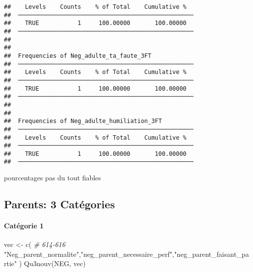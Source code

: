\documentclass[
]{article}
\newenvironment{Shaded}{\begin{snugshade}}{\end{snugshade}}
\newcommand{\CommentTok}[1]{\textcolor[rgb]{0.56,0.35,0.01}{\textit{#1}}}
\newcommand{\FunctionTok}[1]{\textcolor[rgb]{0.00,0.00,0.00}{#1}}
\newcommand{\NormalTok}[1]{#1}
\newcommand{\OtherTok}[1]{\textcolor[rgb]{0.56,0.35,0.01}{#1}}
\newcommand{\StringTok}[1]{\textcolor[rgb]{0.31,0.60,0.02}{#1}}
\begin{document}
\begin{verbatim}
##    Levels    Counts    % of Total    Cumulative %   
##  ────────────────────────────────────────────────── 
##    TRUE           1     100.00000       100.00000   
##  ────────────────────────────────────────────────── 
## 
## 
##  Frequencies of Neg_adulte_ta_faute_3FT             
##  ────────────────────────────────────────────────── 
##    Levels    Counts    % of Total    Cumulative %   
##  ────────────────────────────────────────────────── 
##    TRUE           1     100.00000       100.00000   
##  ────────────────────────────────────────────────── 
## 
## 
##  Frequencies of Neg_adulte_humiliation_3FT          
##  ────────────────────────────────────────────────── 
##    Levels    Counts    % of Total    Cumulative %   
##  ────────────────────────────────────────────────── 
##    TRUE           1     100.00000       100.00000   
##  ──────────────────────────────────────────────────
\end{verbatim}

pourcentages pas du tout fiables

\hypertarget{parents-3-catuxe9gories}{%
\subsection{Parents: 3 Catégories}\label{parents-3-catuxe9gories}}

\hypertarget{catuxe9gorie-1-5}{%
\paragraph{Catégorie 1}\label{catuxe9gorie-1-5}}

\begin{Shaded}
\begin{Highlighting}[]
\NormalTok{vec }\OtherTok{\textless{}{-}} \FunctionTok{c}\NormalTok{(   }\CommentTok{\# 614{-}616}
  \StringTok{"Neg\_parent\_normalite"}\NormalTok{,}\StringTok{"neg\_parent\_necessaire\_perf"}\NormalTok{,}\StringTok{"neg\_parent\_faisant\_partie"}  
\NormalTok{)}
\FunctionTok{Qu3nouv}\NormalTok{(NEG, vec)}
\end{Highlighting}
\end{Shaded}
\end{document}
